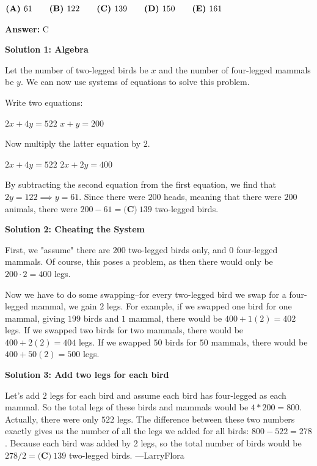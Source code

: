 \begin{enumerate}
 $\textbf{(A)}\hspace{.05in}61\qquad\textbf{(B)}\hspace{.05in}122\qquad\textbf{(C)}\hspace{.05in}139\qquad\textbf{(D)}\hspace{.05in}150\qquad\textbf{(E)}\hspace{.05in}161$

 \textbf{Answer: }C



\textbf{Solution 1: Algebra}

Let the number of two-legged birds be $x$ and the number of four-legged mammals be $y$. We can now use systems of equations to solve this problem.

 Write two equations:

 $2x + 4y = 522$
$x + y = 200$

 Now multiply the latter equation by $2$.

 $2x + 4y = 522$
$2x + 2y = 400$

 By subtracting the second equation from the first equation, we find that $2y = 122 \implies y = 61$. Since there were $200$ heads, meaning that there were $200$ animals, there were $200 - 61 =  \boxed{\textbf{(C)}\ 139}$ two-legged birds.

 



\textbf{Solution 2: Cheating the System}

First, we "assume" there are $200$ two-legged birds only, and $0$ four-legged mammals. Of course, this poses a problem, as then there would only be $200\cdot2=400$ legs.

 Now we have to do some swapping--for every two-legged bird we swap for a four-legged mammal, we gain $2$ legs. For example, if we swapped one bird for one mammal, giving $199$ birds and $1$ mammal, there would be $400 + 1(2) = 402$ legs. If we swapped two birds for two mammals, there would be $400 + 2(2) = 404$ legs. If we swapped $50$ birds for $50$ mammals, there would be $400 + 50(2) = 500$ legs.

 



\textbf{Solution 3: Add two legs for each bird}

Let's add $2$ legs for each bird and assume each bird has four-legged as each mammal. So the total legs of these birds and mammals would be $4*200=800$. Actually, there were only $522$ legs. The difference between these two numbers exactly gives us the number of all the legs we added for all birds: $800 - 522 = 278$. Because each bird was added by 2 legs, so the total number of birds would be $278/2 = \boxed{\textbf{(C)}\ 139}$ two-legged birds. ---LarryFlora


\end{enumerate}

